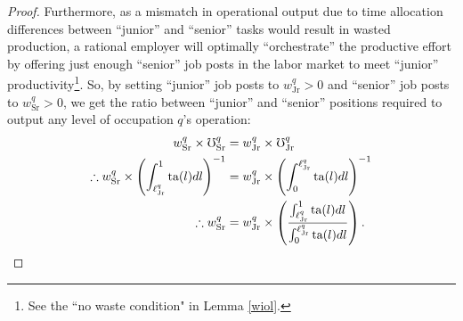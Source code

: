 \documentclass[hidelinks, nonatbib]{elsarticle}
\begin{document}
\begin{theorem}
\begin{proof}
        Furthermore, as a mismatch in operational output due to time allocation differences between ``junior'' and ``senior'' tasks would result in wasted production, a rational employer will optimally ``orchestrate'' the productive effort by offering just enough ``senior'' job posts in the labor market to meet ``junior'' productivity\footnote{See the ``no waste condition" in Lemma \ref{wiol}.}. So, by setting ``junior'' job posts to $w_{\text{Jr}}^{q} > 0$ and ``senior'' job posts to $w_{\text{Sr}}^{q} > 0$, we get the ratio between ``junior'' and ``senior'' positions required to output any level of occupation $q$'s operation:
        \begin{align}
            w_{\text{Sr}}^{q}
            \times 
            \mho_{\text{Sr}}^{q}
            &= 
            w_{\text{Jr}}^{q}
            \times 
            \mho_{\text{Jr}}^{q}
            \\
            \therefore
            w_{\text{Sr}}^{q}
            \times 
            \left(
                \int_{\ell_{\text{Jr}}^{q}}^{1}
                \text{ta}(l)
                dl
            \right) ^ {-1}
            &= 
            w_{\text{Jr}}^{q}
            \times
            \left(
                \int_{0}^{\ell_{\text{Jr}}^{q}}
                    \text{ta}(l)
                    dl
            \right) ^ {-1}
            \\
            \therefore
            w_{\text{Sr}}^{q}
            &= 
            w_{\text{Jr}}^{q}
            \times
            \left(
                \frac{
                    \int_{\ell_{\text{Jr}}^{q}}^{1}
                    \text{ta}(l)
                    dl
                }{
                    \int_{0}^{\ell_{\text{Jr}}^{q}}
                    \text{ta}(l)
                    dl
                }
            \right)
            .
        \end{align}
        

\end{proof}
\end{theorem}
\end{document}

